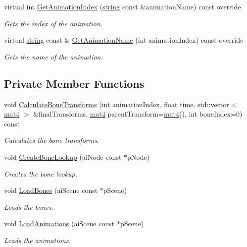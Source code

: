 \begin{DoxyCompactItemize}
virtual int \hyperlink{class_skeleton_a1d805e4a364116706ff9c2ba3072d527}{Get\+Animation\+Index} (\hyperlink{_types_8h_ad453f9f71ce1f9153fb748d6bb25e454}{string} const \&animation\+Name) const  override
\begin{DoxyCompactList}\small\item\em Gets the index of the animation. \end{DoxyCompactList}\item 
virtual \hyperlink{_types_8h_ad453f9f71ce1f9153fb748d6bb25e454}{string} const \& \hyperlink{class_skeleton_a4778c245da8f20ccf7aeb53f75f6882b}{Get\+Animation\+Name} (int animation\+Index) const  override
\begin{DoxyCompactList}\small\item\em Gets the name of the animation. \end{DoxyCompactList}\end{DoxyCompactItemize}
\subsection*{Private Member Functions}
\begin{DoxyCompactItemize}
\item 
void \hyperlink{class_skeleton_acb1d4da86553e8df31208a67c03b92ae}{Calculate\+Bone\+Transforms} (int animation\+Index, float time, std\+::vector$<$ \hyperlink{_types_8h_a2db59f395fe82a7394c6324956c265d8}{mat4} $>$ \&final\+Transforms, \hyperlink{_types_8h_a2db59f395fe82a7394c6324956c265d8}{mat4} parent\+Transform=\hyperlink{_types_8h_a2db59f395fe82a7394c6324956c265d8}{mat4}(), int bone\+Index=0) const 
\begin{DoxyCompactList}\small\item\em Calculates the bone transforms. \end{DoxyCompactList}\item 
void \hyperlink{class_skeleton_a5c17fbf494ac8f40cd81d0f2da7e0c6e}{Create\+Bone\+Lookup} (ai\+Node const $\ast$p\+Node)
\begin{DoxyCompactList}\small\item\em Creates the bone lookup. \end{DoxyCompactList}\item 
void \hyperlink{class_skeleton_a56489c3623441f2740a4944225f5a2fa}{Load\+Bones} (ai\+Scene const $\ast$p\+Scene)
\begin{DoxyCompactList}\small\item\em Loads the bones. \end{DoxyCompactList}\item 
void \hyperlink{class_skeleton_af10380d2615f74c4003ee37e71dac71b}{Load\+Animations} (ai\+Scene const $\ast$p\+Scene)
\begin{DoxyCompactList}\small\item\em Loads the animations. \end{DoxyCompactList}\end{DoxyCompactItemize}
